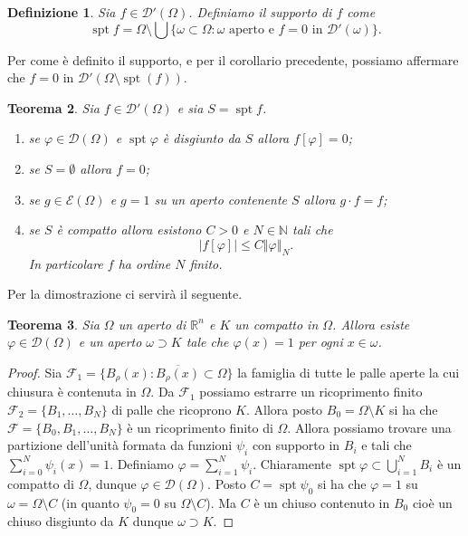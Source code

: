 \documentclass[italian,a4paper,oneside,headinclude]{scrbook}
\renewcommand{\phi}{\varphi}
\newcommand{\D}{\mathcal D}
\newcommand{\E}{\mathcal E}
\newcommand{\F}{\mathcal F}
\newcommand{\NN}{\mathbb N}
\newcommand{\RR}{\mathbb R}
\newcommand{\abs}[1]{{\left|#1\right|}}
\newcommand{\Abs}[1]{{\left\Vert #1\right\Vert}}
\DeclareMathOperator{\spt}{spt}
\newtheorem{theorem}{Teorema}
\newtheorem{definition}[theorem]{Definizione}
\begin{document}
\begin{definition}
  Sia $f\in\D'(\Omega)$. Definiamo il \emph{supporto} di $f$ come
  \[
  \spt f = \Omega\setminus
  \bigcup\{\omega\subset \Omega\colon \text{$\omega$ aperto e
    $f=0$ in $\D'(\omega)$}\}.
  \]
\end{definition}
Per come è definito il supporto,
e per il corollario precedente, possiamo affermare che $f=0$ in
$\D'(\Omega\setminus \spt(f))$.

\begin{theorem}\label{th:distr_supp_comp}
  Sia $f\in \D'(\Omega)$ e sia $S=\spt f$.
  \begin{enumerate}
  \item se $\phi\in\D(\Omega)$ e $\spt \phi$
    è disgiunto da $S$ allora $f[\phi]=0$;
  \item se $S=\emptyset$ allora $f=0$;
  \item se $g \in \E(\Omega)$ e $g = 1$ su un aperto
    contenente $S$ allora $g \cdot f = f$;
  \item se $S$ è compatto allora esistono $C>0$ e
    $N\in\NN$ tali che
    \[
    \abs{f[\phi]} \le C \Abs{\phi}_N.
    \]
    In particolare $f$ ha ordine $N$ finito.
  \end{enumerate}
\end{theorem}
%
Per la dimostrazione ci servirà il seguente.
\begin{theorem}
  Sia $\Omega$ un aperto di $\RR^n$ e $K$ un compatto in
  $\Omega$. Allora esiste $\phi\in \D(\Omega)$ e un aperto
  $\omega\supset K$ tale che $\phi(x) = 1$ per ogni $x\in \omega$.
\end{theorem}
%
\begin{proof}
  Sia $\F_1=\{B_\rho(x)\colon \overline{B_{\rho}(x)}\subset \Omega\}$
  la famiglia di tutte le palle aperte la cui chiusura è contenuta in
  $\Omega$. Da $\F_1$ possiamo estrarre un ricoprimento finito
  $\F_2=\{B_1,\dots, B_N\}$ di palle che ricoprono $K$.
  Allora posto $B_0=\Omega\setminus K$ si ha che $\F = \{B_0,
  B_1,\dots, B_N\}$ è un
  ricoprimento finito di $\Omega$. Allora possiamo trovare una
  partizione dell'unità formata da funzioni $\psi_i$ con supporto in
  $B_i$ e tali che $\sum_{i=0}^N \psi_i(x)=1$.
  Definiamo $\phi = \sum_{i=1}^N \psi_i$.
  Chiaramente $\spt \phi \subset \bigcup_{i=1}^N B_i$ è un compatto di
  $\Omega$, dunque $\phi\in \D(\Omega)$. Posto $C=\spt \psi_0$ si ha
  che $\phi=1$ su $\omega = \Omega \setminus C$
  (in quanto $\psi_0=0$ su $\Omega\setminus C$). Ma $C$ è un chiuso
  contenuto in $B_0$ cioè un chiuso disgiunto da $K$ dunque
  $\omega\supset K$.
\end{proof}
\end{document}
